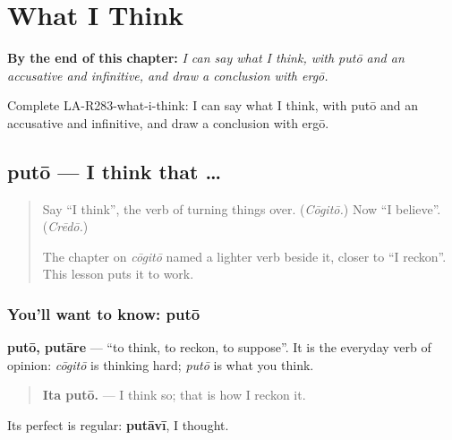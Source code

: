 
\chapter{What I Think}
\label{ch:la-what-i-think}

\begin{chapteropening}
\textbf{By the end of this chapter:} \emph{I can say what I think, with putō and an accusative and infinitive, and draw a conclusion with ergō.}

Complete LA-R283-what-i-think: I can say what I think, with putō and an accusative and infinitive, and draw a conclusion with ergō.
\end{chapteropening}

\section[putō, putāre]{putō — I think that …}

\label{lesson:LA-C283-puto}



\begin{quote}
Say \textquotedblleft{}I think\textquotedblright{}, the verb of turning things over. (\emph{Cōgitō.}) Now \textquotedblleft{}I believe\textquotedblright{}. (\emph{Crēdō.})

The chapter on \emph{cōgitō} named a lighter verb beside it, closer to \textquotedblleft{}I reckon\textquotedblright{}. This lesson puts it to work.
\end{quote}

\subsection*{You'll want to know: putō}
\textbf{putō, putāre} — \textquotedblleft{}to think, to reckon, to suppose\textquotedblright{}. It is the everyday verb of opinion: \emph{cōgitō} is thinking hard; \emph{putō} is what you think.

\begin{quote}
\textbf{Ita putō.} — I think so; that is how I reckon it.
\end{quote}

Its perfect is regular: \textbf{putāvī}, I thought.

